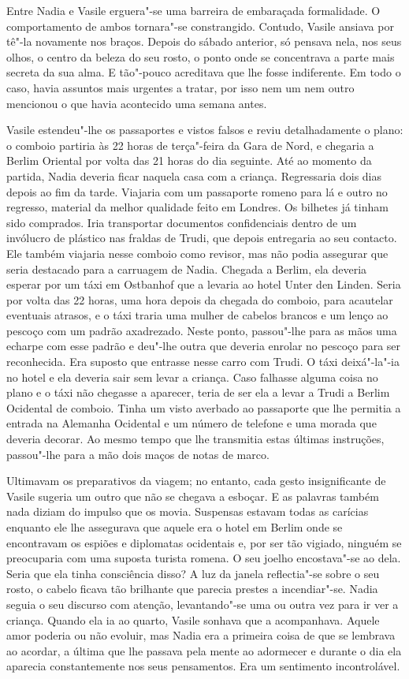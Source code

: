 Entre Nadia e Vasile erguera"-se uma barreira de embaraçada
formalidade. O comportamento de ambos tornara"-se constrangido. Contudo, Vasile ansiava por tê"-la novamente nos
braços. Depois do sábado anterior, só pensava nela, nos seus olhos, o
centro da beleza do seu rosto, o ponto onde se concentrava a parte mais
secreta da sua alma. E tão"-pouco acreditava que lhe fosse indiferente.
Em todo o caso, havia assuntos mais urgentes a tratar, por isso
nem um nem outro mencionou o que havia acontecido uma semana antes.

Vasile estendeu"-lhe os passaportes e vistos falsos e reviu
detalhadamente o plano: o comboio partiria às 22 horas de terça"-feira da
Gara de Nord, e chegaria a Berlim Oriental por volta das 21 horas do
dia seguinte. Até ao momento da partida, Nadia deveria ficar naquela
casa com a criança. Regressaria dois dias depois ao fim da tarde.
Viajaria com um passaporte romeno para lá e outro no regresso, material da melhor qualidade feito em Londres. Os bilhetes já tinham sido
comprados. Iria transportar documentos confidenciais dentro de um
invólucro de plástico nas fraldas de Trudi, que depois entregaria ao
seu contacto. Ele também viajaria nesse comboio como revisor, mas não
podia assegurar que seria destacado para a carruagem de Nadia. Chegada a
Berlim, ela deveria esperar por um táxi em Ostbanhof que a levaria ao
hotel Unter den Linden. Seria por volta das 22 horas, uma hora depois da
chegada do comboio, para acautelar eventuais atrasos, e o táxi traria
uma mulher de cabelos brancos e um lenço ao pescoço com um padrão
axadrezado. Neste ponto, passou"-lhe para as mãos uma echarpe com esse
padrão e deu"-lhe outra que deveria enrolar no pescoço para ser
reconhecida. Era suposto que entrasse nesse carro com Trudi. O táxi
deixá"-la"-ia no hotel e ela deveria sair sem levar a criança. Caso
falhasse alguma coisa no plano e o táxi não chegasse a aparecer, teria
de ser ela a levar a Trudi a Berlim Ocidental de comboio. Tinha um
visto averbado ao passaporte que lhe permitia a entrada na Alemanha
Ocidental e um número de telefone e uma morada que deveria decorar. Ao
mesmo tempo que lhe transmitia estas últimas instruções, passou"-lhe para
a mão dois maços de notas de marco.

Ultimavam os preparativos da viagem; no entanto, cada gesto
insignificante de Vasile sugeria um outro que não se chegava a esboçar.
E as palavras também nada diziam do impulso que os movia. Suspensas
estavam todas as carícias enquanto ele lhe assegurava que aquele era o
hotel em Berlim onde se encontravam os espiões e diplomatas ocidentais
e, por ser tão vigiado, ninguém se preocuparia com uma suposta turista
romena. O seu joelho encostava"-se ao dela. Seria que ela tinha
consciência disso? A luz da janela reflectia"-se sobre o seu rosto, o
cabelo ficava tão brilhante que parecia prestes a incendiar"-se. Nadia
seguia o seu discurso com atenção, levantando"-se uma ou outra vez para
ir ver a criança. Quando ela ia ao quarto, Vasile sonhava que a
acompanhava. Aquele amor poderia ou não evoluir, mas Nadia era a
primeira coisa de que se lembrava ao acordar, a última que lhe passava
pela mente ao adormecer e durante o dia ela aparecia constantemente
nos seus pensamentos. Era um sentimento incontrolável.

